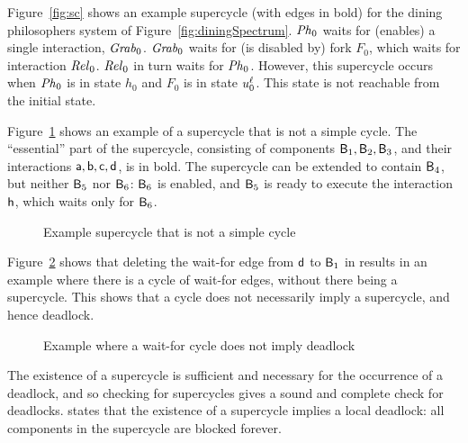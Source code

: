 \begin{figure*}[ht]
  \begin{center}
   \scalebox{0.4}{}
   \caption{Example supercycle for dining philosophers system of Figure~\ref{fig:diningSpectrum}.}
   \label{fig:sc}
  \end{center}
\end{figure*}


Figure~\ref{fig:sc} shows an example supercycle (with edges in bold) for the dining philosophers
system of Figure~\ref{fig:diningSpectrum}.
$\mathit{Ph}_0$ waits for (enables) a single interaction, $\mathit{Grab}_0$. 
$\mathit{Grab}_0$ waits for (is disabled by) fork $F_0$, which waits for interaction $\mathit{Rel}_0$.
$\mathit{Rel}_0$ in turn waits for $\mathit{Ph}_0$. However, this supercycle occurs when $\mathit{Ph}_0$ is in state $h_0$
and $F_0$ is in state $u_0^\ell$. This state is not reachable from the initial state. 


Figure~\ref{fig:SCnotCycle} shows an example of a supercycle that is not a simple cycle.  The ``essential'' part of the supercycle, consisting of
components $\mathsf{B}_1, \mathsf{B}_2, \mathsf{B}_3$, and their interactions $\mathsf{a}, \mathsf{b}, \mathsf{c}, \mathsf{d}$, is in bold.  
The supercycle can be extended to contain $\mathsf{B}_4$, but neither $\mathsf{B}_5$ nor
$\mathsf{B}_6$: $\mathsf{B}_6$ is enabled, and $\mathsf{B}_5$ is ready to execute the interaction $\mathsf{h}$, which waits only for $\mathsf{B}_6$.
%
\begin{figure}[ht]
\begin{center}
\scalebox{0.6}{}
\caption{Example supercycle that is not a simple cycle}
\label{fig:SCnotCycle}
\end{center}
\end{figure}
%
Figure~\ref{fig:cycleOK} shows that deleting the wait-for edge from $\mathsf{d}$ to $\mathsf{B}_1$ in  results in 
an example where there is
a cycle of wait-for edges, without there being a supercycle. This shows
that a cycle does not necessarily imply a supercycle, and hence
deadlock. 
%
\begin{figure}[ht]
\begin{center}
\scalebox{0.6}{}
\caption{Example where a wait-for cycle does not imply deadlock}
\label{fig:cycleOK}
\end{center}
\end{figure}


The existence of a supercycle is sufficient and necessary for the occurrence of
a deadlock, and so checking for supercycles gives a sound and complete check for
deadlocks.  
%
 states that the
existence of a supercycle implies a local deadlock: all components in
the supercycle are blocked forever.

